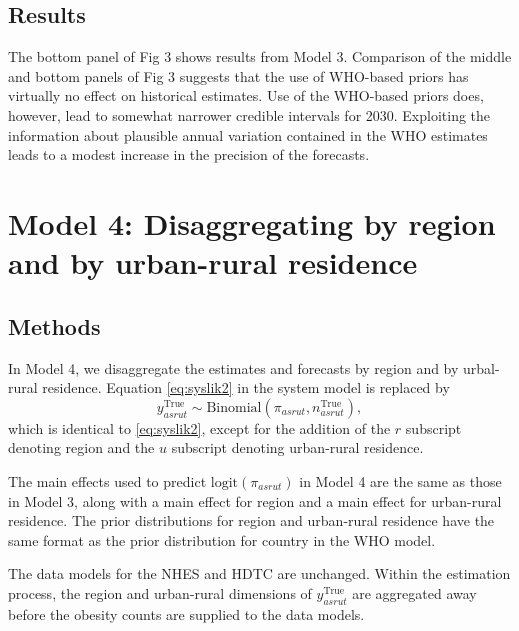 \documentclass[10pt,letterpaper]{article}
\begin{document}
\hypertarget{results-2}{%
\subsection{Results}\label{results-2}}

The bottom panel of Fig 3 shows results from Model 3. Comparison of the
middle and bottom panels of Fig 3 suggests that the use of WHO-based
priors has virtually no effect on historical estimates. Use of the
WHO-based priors does, however, lead to somewhat narrower credible
intervals for 2030. Exploiting the information about plausible annual
variation contained in the WHO estimates leads to a modest increase in
the precision of the forecasts.

\hypertarget{model-4-disaggregating-by-region-and-by-urban-rural-residence}{%
\section{Model 4: Disaggregating by region and by urban-rural
residence}\label{model-4-disaggregating-by-region-and-by-urban-rural-residence}}

\hypertarget{methods-3}{%
\subsection{Methods}\label{methods-3}}

In Model 4, we disaggregate the estimates and forecasts by region and by
urbal-rural residence. Equation \eqref{eq:syslik2} in the system model
is replaced by \begin{equation}
  y_{asrut}^{\text{True}} \sim \text{Binomial}(\pi_{asrut}, n_{asrut}^{\text{True}}), \label{eq:likmod4}
\end{equation} which is identical to \eqref{eq:syslik2}, except for the
addition of the \(r\) subscript denoting region and the \(u\) subscript
denoting urban-rural residence.

The main effects used to predict \(\text{logit}(\pi_{asrut})\) in Model
4 are the same as those in Model 3, along with a main effect for region
and a main effect for urban-rural residence. The prior distributions for
region and urban-rural residence have the same format as the prior
distribution for country in the WHO model.

The data models for the NHES and HDTC are unchanged. Within the
estimation process, the region and urban-rural dimensions of
\(y_{asrut}^{\text{True}}\) are aggregated away before the obesity
counts are supplied to the data models.
\end{document}
